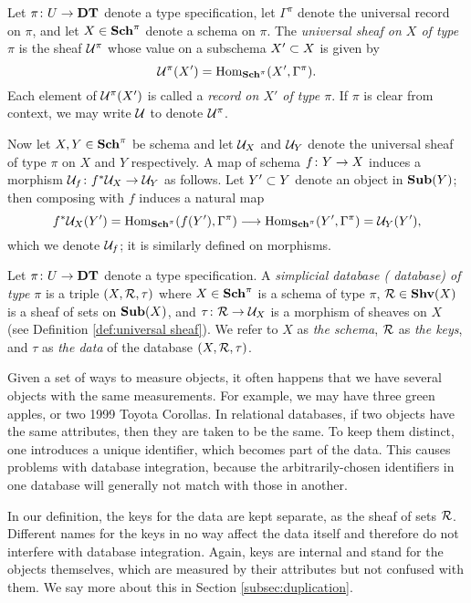 \documentclass{amsart}
\begin{document}
\begin{definition}\label{def:universal sheaf}

Let $\pi\taking U\to\DT$ denote a type specification, let $\Gamma^\pi$ denote the universal record on $\pi$, and let $X\in\Sch^\pi$ denote a schema on $\pi$.  The {\em universal sheaf on $X$ of type $\pi$} is the sheaf $\mcU^\pi$ whose value on a subschema $X'\ss X$ is given by $$\mcU^\pi(X')=\Hom_{\Sch^\pi}(X',\Gamma^\pi).$$  Each element of $\mcU^\pi(X')$ is called a {\em record on $X'$ of type $\pi$}.  If $\pi$ is clear from context, we may write $\mcU$ to denote $\mcU^\pi$.

Now let $X,Y\in\Sch^\pi$ be schema and let $\mcU_X$ and $\mcU_Y$ denote the universal sheaf of type $\pi$ on $X$ and $Y$ respectively.  A map of schema $f\taking Y \to X$ induces a morphism $\mcU_f\taking f^*\mcU_X\to\mcU_Y$ as follows.  Let $Y'\ss Y$ denote an object in $\Sub(Y)$; then composing with $f$ induces a natural map $$f^*\mcU_X(Y')=\Hom_{\Sch^\pi}(f(Y'),\Gamma^\pi)\too\Hom_{\Sch^\pi}(Y',\Gamma^\pi)=\mcU_Y(Y'),$$ which we denote $\mcU_f$; it is similarly defined on morphisms.

\end{definition}

\begin{definition}\label{def:database objects}

Let $\pi\taking U\to\DT$ denote a type specification.  A {\em simplicial database ( database) of type $\pi$} is a triple $(X,\mcR,\tau)$ where $X\in\Sch^\pi$ is a schema of type $\pi$, $\mcR\in\Shv(X)$ is a sheaf of sets on $\Sub(X)$, and $\tau\taking\mcR\to\mcU_X$ is a morphism of sheaves on $X$ (see Definition \ref{def:universal sheaf}).  We refer to $X$ as {\em the schema}, $\mcR$ as {\em the keys}, and $\tau$ as {\em the data} of the database $(X,\mcR,\tau)$.

\end{definition}

\begin{remark}\label{rem:internal keys}

Given a set of ways to measure objects, it often happens that we have several objects with the same measurements.  For example, we may have three green apples, or two 1999 Toyota Corollas.  In relational databases, if two objects have the same attributes, then they are taken to be the same.  To keep them distinct, one introduces a unique identifier, which becomes part of the data.  This causes problems with database integration, because the arbitrarily-chosen identifiers in one database will generally not match with those in another.

In our definition, the keys for the data are kept separate, as the sheaf of sets $\mcR$.  Different names for the keys in no way affect the data itself and therefore do not interfere with database integration.  Again, keys are internal and stand for the objects themselves, which are measured by their attributes but not confused with them.  We say more about this in Section \ref{subsec:duplication}.

\end{remark}
\end{document}
